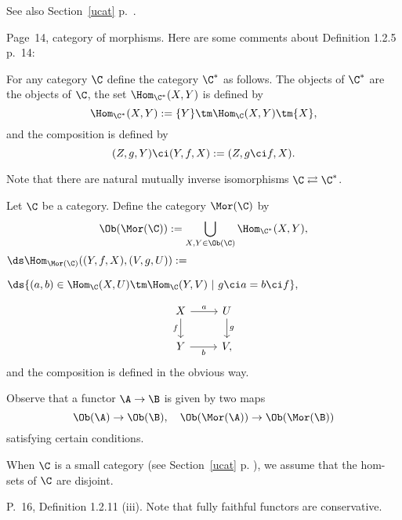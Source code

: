 \documentclass[12pt]{article}
\theoremstyle{remark}
\theoremstyle{definition}
\begin{document}
See also Section~\ref{ucat} p.~\pageref{ucat}.



\begin{s}
Page~14, category of morphisms. Here are some comments about Definition 1.2.5 p.~14:

\begin{nota}
For any category $\C$ define the category $\C^*$\index{$\C^*$} as follows. The objects of $\C^*$ are the objects of $\C$, the set $\Hom_{\C^*}(X,Y)$ is defined by 
$$
\Hom_{\C^*}(X,Y):=\{Y\}\tm\Hom_{\C}(X,Y)\tm\{X\},
$$
and the composition is defined by 
$$
(Z,g,Y)\ci(Y,f,X):=(Z,g\ci f,X).
$$ 
\end{nota}

Note that there are natural mutually inverse isomorphisms $\C\rightleftarrows\C^*$. 

\begin{nota}
Let $\C$ be a category. Define the category $\Mor(\C)$ \index{$\Mor$} by 
$$
\Ob(\Mor(\C)):=\bigcup_{X,Y\in\Ob(\C)}\Hom_{\C^*}(X,Y),
$$
$\ds\Hom_{\Mor(\C)}((Y,f,X),(V,g,U)):=$\bigskip 

$\hfill\ds\{(a,b)\in\Hom_\C(X,U)\tm\Hom_\C(Y,V)\ | \ g\ci a=b\ci f\},$\bigskip

$$
\begin{tikzcd}
X\ar{d}[swap]{f}\ar{r}{a}&U\ar{d}{g}\\ 
Y\ar{r}[swap]{b}&V,
\end{tikzcd}
$$ 
and the composition is defined in the obvious way.
\end{nota}

Observe that a functor $\A\to\B$ is given by two maps 
$$
\Ob(\A)\to\Ob(\B),\quad\Ob(\Mor(\A))\to\Ob(\Mor(\B))
$$ 
satisfying certain conditions.

When $\C$ is a small category (see Section~\ref{ucat} p. ), we assume that the hom-sets of $\C$ are disjoint.
\end{s}

%

\begin{s}
P.~16, Definition 1.2.11 (iii). Note that fully faithful functors are conservative. 
\end{s}

%

\begin{comment}
\begin{s}
P.~16. Here is a question. 

Let $\U$ be a universe, let $\C$ be a category such that $\Hom_\C(X,Y)\in\U$ for all objects $X,Y$ of $\C$, and let $\Set$ be the category of $\U$-sets, let $F:\C^{\op}\to\Set$ be a \emph{representable} functor. 

Is the set of subfunctors of $F$ equipotent to some $\U$-set? 

Same question for the set of quotients of $F$. 
\end{s}
\end{comment}
\end{document}
